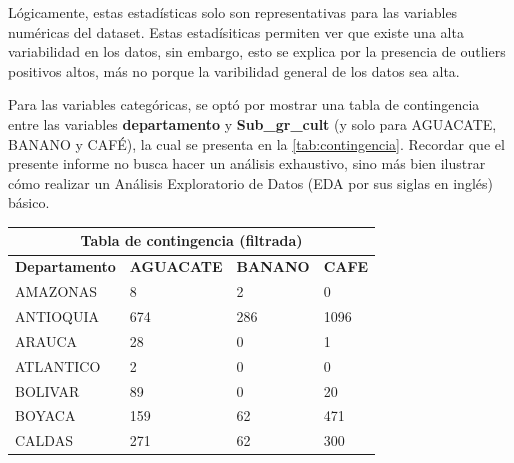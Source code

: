 \documentclass[12pt,a4paper]{article}
\begin{document}
Lógicamente, estas estadísticas solo son representativas para las variables numéricas del dataset. 
Estas estadísiticas permiten ver que existe una alta variabilidad en los datos, sin embargo, esto 
se explica por la presencia de outliers positivos altos, más no porque la varibilidad general 
de los datos sea alta.

Para las variables categóricas, se optó por mostrar una tabla de contingencia entre las variables 
\textbf{departamento} y \textbf{Sub\_gr\_cult} (y solo para AGUACATE, BANANO y CAFÉ), la cual se 
presenta en la \cref{tab:contingencia}. Recordar que el presente informe no busca hacer un análisis 
exhaustivo, sino más bien ilustrar cómo realizar un Análisis Exploratorio de Datos (EDA por sus siglas 
en inglés) básico.


\begin{table}[H]
    \centering
    \small
    \begin{tabular}{|llll|}
        \hline
        \multicolumn{4}{|c|}{\textbf{Tabla de contingencia (filtrada)}}                                                                                \\ \hline
        \multicolumn{1}{|l|}{\textbf{Departamento}}    & \multicolumn{1}{l|}{\textbf{AGUACATE}} & \multicolumn{1}{l|}{\textbf{BANANO}} & \textbf{CAFE} \\ \hline
        \multicolumn{1}{|l|}{AMAZONAS}                 & \multicolumn{1}{l|}{8}                 & \multicolumn{1}{l|}{2}               & 0             \\ \hline
        \multicolumn{1}{|l|}{ANTIOQUIA}                & \multicolumn{1}{l|}{674}               & \multicolumn{1}{l|}{286}             & 1096          \\ \hline
        \multicolumn{1}{|l|}{ARAUCA}                   & \multicolumn{1}{l|}{28}                & \multicolumn{1}{l|}{0}               & 1             \\ \hline
        \multicolumn{1}{|l|}{ATLANTICO}                & \multicolumn{1}{l|}{2}                 & \multicolumn{1}{l|}{0}               & 0             \\ \hline
        \multicolumn{1}{|l|}{BOLIVAR}                  & \multicolumn{1}{l|}{89}                & \multicolumn{1}{l|}{0}               & 20            \\ \hline
        \multicolumn{1}{|l|}{BOYACA}                   & \multicolumn{1}{l|}{159}               & \multicolumn{1}{l|}{62}              & 471           \\ \hline
        \multicolumn{1}{|l|}{CALDAS}                   & \multicolumn{1}{l|}{271}               & \multicolumn{1}{l|}{62}              & 300           \\ \hline

\end{tabular}
\end{table}
\end{document}
